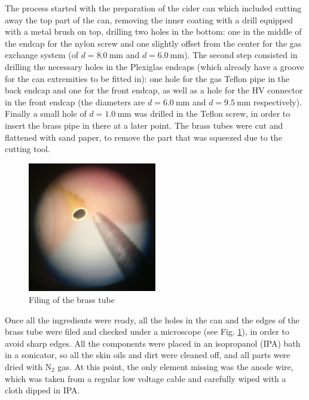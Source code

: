 The process started with the preparation of the cider can which included cutting
away the top part of the can, removing the inner coating with a drill equipped with a
metal brush on top, drilling two holes in the bottom: one in the middle of the
endcap for the nylon screw and one slightly offset from the center for the
gas exchange system (of $d = \SI{8.0}{\milli\meter}$ and $d =
\SI{6.0}{\milli\meter}$). The second step consisted in drilling the necessary
holes in the Plexiglas endcaps (which already have a groove for the can
extremities to be fitted in): one hole for the gas Teflon pipe in the back
endcap and one for the front endcap, as well as a hole for the HV connector in the
front endcap (the diameters are $d = \SI{6.0}{\milli\meter}$ and $d =
\SI{9.5}{\milli\meter}$ respectively). Finally a small hole of $d =
\SI{1.0}{\milli\meter}$ was drilled in the Teflon screw, in order to insert the
brass pipe in there at a later point. The brass tubes were cut and flattened
with sand paper, to remove the part that was squeezed due to the cutting tool.

\begin{figure}[htb]
  \centering
  \includegraphics[width=0.5\textwidth]{./graphics/brass_file.jpg}
  \caption{Filing of the brass tube}
  \label{fig:brass_file}
\end{figure}


Once all the ingredients were ready, all the holes in the can and the edges of
the brass tube were filed and checked under a microscope (see Fig. \ref{fig:brass_file}), in order to avoid
sharp edges. All the components were placed in an isopropanol (IPA) bath in a
sonicator, so all the skin oils and dirt were cleaned off, and all parts were
dried with $\mathrm{N}_2$ gas. At this point, the only element missing was the
anode wire, which was taken from a regular low voltage cable and carefully wiped
with a cloth dipped in IPA.


